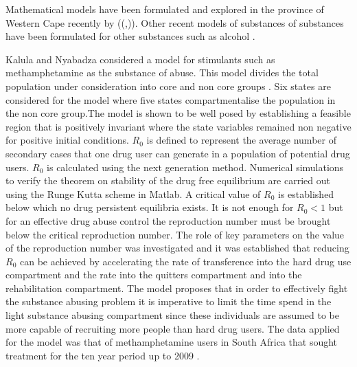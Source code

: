 Mathematical models have been formulated and explored in the province of Western Cape recently by ((\cite{kalula2012},\cite{nyabadza2010})). Other recent models of substances of substances have been formulated for other substances such as alcohol \cite{alcohol2007}.

Kalula and Nyabadza  considered a model for stimulants such as methamphetamine as the substance of abuse. This model divides the total population under consideration into core and non core groups . Six states are considered for the model where five states compartmentalise the population in the non core group.The model is shown to be well posed by establishing a feasible region that is positively invariant where the state variables remained non negative for positive initial  conditions. $R_0$ is defined to represent the average number of secondary cases that one drug user can generate in a population of potential drug users. $R_0$ is calculated using the next generation method. Numerical simulations to verify the theorem on stability of the drug free equilibrium are carried out using the Runge Kutta scheme in Matlab. A critical value of $R_0$ is established below which no drug persistent equilibria exists. It is not enough for $R_0 <1$ but for an effective drug abuse control the reproduction number must be brought below the critical reproduction number. The role of key parameters on the value of the reproduction number was investigated and it was established that reducing $R_0$ can be achieved by accelerating the rate of transference into the hard drug use compartment and the rate into the quitters compartment and into the rehabilitation compartment. The model proposes that in order to effectively fight the substance abusing problem it is imperative to limit the time spend in the light substance abusing compartment since these individuals are assumed to be more capable of recruiting more people than hard drug users. The data applied for the model was that of methamphetamine users in South Africa that sought treatment for the ten year period up to 2009 \cite{kalula2012}.

